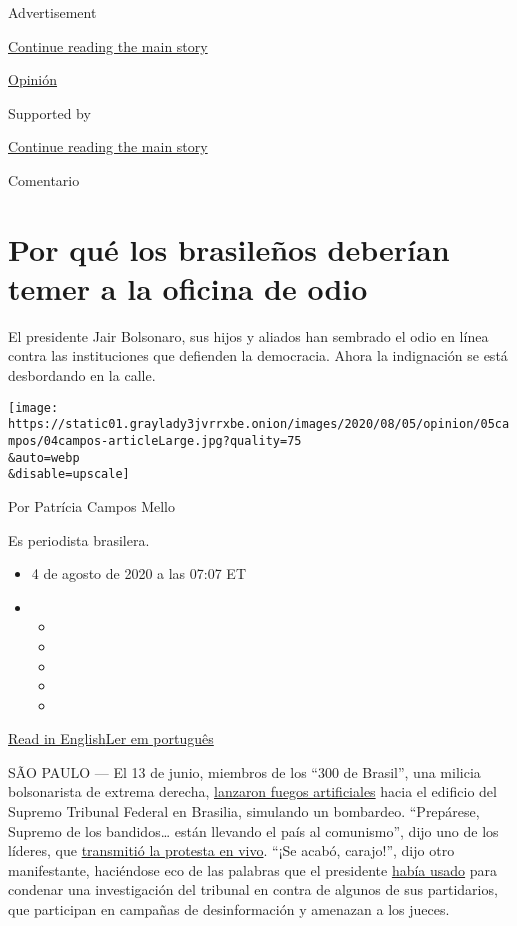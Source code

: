 Advertisement

\protect\hyperlink{after-top}{Continue reading the main story}

\href{/es/section/opinion}{Opinión}

Supported by

\protect\hyperlink{after-sponsor}{Continue reading the main story}

Comentario

\hypertarget{por-quuxe9-los-brasileuxf1os-deberuxedan-temer-a-la-oficina-de-odio}{%
\section{Por qué los brasileños deberían temer a la oficina de
odio}\label{por-quuxe9-los-brasileuxf1os-deberuxedan-temer-a-la-oficina-de-odio}}

El presidente Jair Bolsonaro, sus hijos y aliados han sembrado el odio
en línea contra las instituciones que defienden la democracia. Ahora la
indignación se está desbordando en la calle.

\texttt{[image: https://static01.graylady3jvrrxbe.onion/images/2020/08/05/opinion/05campos/04campos-articleLarge.jpg?quality=75\\\&auto=webp\\\&disable=upscale]}

Por Patrícia Campos Mello

Es periodista brasilera.

\begin{itemize}
\item
  4 de agosto de 2020 a las 07:07 ET
\item
  \begin{itemize}
  \item
  \item
  \item
  \item
  \item
  \end{itemize}
\end{itemize}

\href{https://www.nytimes3xbfgragh.onion/2020/08/04/opinion/bolsonaro-office-of-hate-brazil.html}{Read
in
English}\href{https://www.nytimes3xbfgragh.onion/pt/2020/08/04/opinion/international-world/bolsonaro-gabinete-do-odio.html}{Ler
em português}

SÃO PAULO --- El 13 de junio, miembros de los ``300 de Brasil'', una
milicia bolsonarista de extrema derecha,
\href{https://www1.folha.uol.com.br/poder/2020/05/sara-winter-xinga-moraes-diz-querer-trocar-socos-com-ele-e-promete-inferniza-lo.shtml}{lanzaron
fuegos artificiales} hacia el edificio del Supremo Tribunal Federal en
Brasilia, simulando un bombardeo. ``Prepárese, Supremo de los
bandidos\ldots{} están llevando el país al comunismo'', dijo uno de los
líderes, que
\href{https://www.metropoles.com/brasil/video-bolsonaristas-lancam-fogos-de-artificio-em-predio-do-stf}{transmitió
la protesta en vivo}. ``¡Se acabó, carajo!'', dijo otro manifestante,
haciéndose eco de las palabras que el presidente
\href{https://www.youtube.com/watch?v=I2bZoC8FHJI}{había usado} para
condenar una investigación del tribunal en contra de algunos de sus
partidarios, que participan en campañas de desinformación y amenazan a
los jueces.

